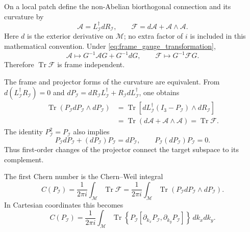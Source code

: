 \documentclass[11pt]{article}
\numberwithin{equation}{section}
\begin{document}
On a local patch define the non-Abelian biorthogonal connection and its
curvature by
\begin{equation}
  \mathcal A=L_{\mathcal I}^\dagger dR_{\mathcal I},
  \qquad
  \mathcal F=d\mathcal A+\mathcal A\wedge\mathcal A .
  \label{eq:connection_curvature}
\end{equation}
Here $d$ is the exterior derivative on $\mathcal M$; no extra factor of
$i$ is included in this mathematical convention. Under
\eqref{eq:frame_gauge_transformation},
\begin{equation}
  \mathcal A\mapsto G^{-1}\mathcal A G+G^{-1}dG,
  \qquad
  \mathcal F\mapsto G^{-1}\mathcal F G .
  \label{eq:connection_gauge_law}
\end{equation}
Therefore $\operatorname{Tr}\mathcal F$ is frame independent.

The frame and projector forms of the curvature are equivalent. From
$d(L_{\mathcal I}^\dagger R_{\mathcal I})=0$ and
$dP_{\mathcal I}=dR_{\mathcal I}L_{\mathcal I}^\dagger+
R_{\mathcal I}dL_{\mathcal I}^\dagger$, one obtains
\begin{align}
  \operatorname{Tr}(P_{\mathcal I}dP_{\mathcal I}\wedge dP_{\mathcal I})
  &=\operatorname{Tr}\!\left[
  dL_{\mathcal I}^\dagger(I_3-P_{\mathcal I})\wedge
  dR_{\mathcal I}\right]\nonumber\\
  &=\operatorname{Tr}(d\mathcal A+
  \mathcal A\wedge\mathcal A)
  =\operatorname{Tr}\mathcal F .
  \label{eq:projector_frame_curvature}
\end{align}
The identity $P_{\mathcal I}^2=P_{\mathcal I}$ also implies
\begin{equation}
  P_{\mathcal I}dP_{\mathcal I}+(dP_{\mathcal I})P_{\mathcal I}
  =dP_{\mathcal I},
  \qquad
  P_{\mathcal I}(dP_{\mathcal I})P_{\mathcal I}=0 .
  \label{eq:projector_differential_identities}
\end{equation}
Thus first-order changes of the projector connect the target subspace to
its complement.

The first Chern number is the Chern--Weil integral
\begin{equation}
  C(P_{\mathcal I})=\frac{1}{2\pi i}
  \int_{\mathcal M}\operatorname{Tr}\mathcal F
  =\frac{1}{2\pi i}
  \int_{\mathcal M}
  \operatorname{Tr}(P_{\mathcal I}dP_{\mathcal I}\wedge dP_{\mathcal I}).
  \label{eq:projector_chern}
\end{equation}
In Cartesian coordinates this becomes
\begin{equation}
  C(P_{\mathcal I})=\frac{1}{2\pi i}
  \int_{\mathcal M}
  \operatorname{Tr}\!\left\{
  P_{\mathcal I}
  [\partial_{k_x}P_{\mathcal I},\partial_{k_y}P_{\mathcal I}]
  \right\}\,dk_xdk_y .
  \label{eq:projector_chern_cartesian}
\end{equation}
\end{document}
